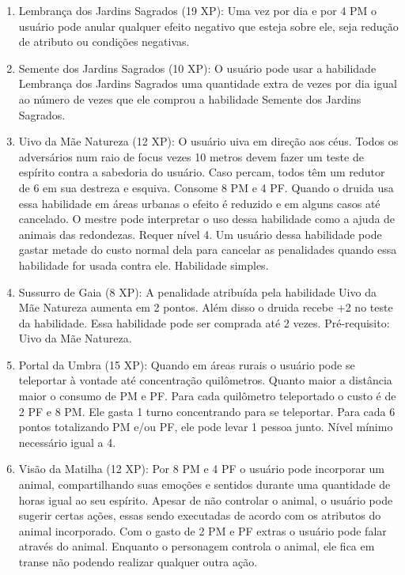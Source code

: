 \begin{enumerate}
  	 
			\item Lembrança dos Jardins Sagrados (19 XP): Uma vez por dia e por 4 PM o usuário pode anular qualquer efeito negativo que esteja sobre ele, seja redução de atributo ou condições negativas.

			  \item Semente dos Jardins Sagrados (10 XP): O usuário pode usar a habilidade Lembrança dos Jardins Sagrados uma quantidade extra de vezes por dia igual ao número de vezes que ele comprou a habilidade Semente dos Jardins Sagrados.

  	\item Uivo da Mãe Natureza (12 XP): O usuário uiva em direção aos céus. Todos os adversários num raio de focus vezes 10 metros devem fazer um teste de espírito contra a sabedoria do usuário. Caso percam, todos têm um redutor de 6 em sua destreza e esquiva. Consome 8 PM e 4 PF. Quando o druida usa essa habilidade em áreas urbanas o efeito é reduzido e em alguns casos até cancelado. O mestre pode interpretar o uso dessa habilidade como a ajuda de animais das redondezas. Requer nível 4. Um usuário dessa habilidade pode gastar metade do custo normal dela para cancelar as penalidades quando essa habilidade for usada contra ele. Habilidade simples.
	  
    \item Sussurro de Gaia (8 XP): A penalidade atribuída pela habilidade Uivo da Mãe Natureza aumenta em 2 pontos. Além disso o druida recebe +2 no teste da habilidade. Essa habilidade pode ser comprada até 2 vezes. Pré-requisito: Uivo da Mãe Natureza.
  
  	\item Portal da Umbra (15 XP): Quando em áreas rurais o usuário pode se teleportar à vontade até concentração quilômetros. Quanto maior a distância maior o consumo de PM e PF. Para cada quilômetro teleportado o custo é de 2 PF e 8 PM. Ele gasta 1 turno concentrando para se teleportar. Para cada 6 pontos totalizando PM e/ou PF, ele pode levar 1 pessoa junto. Nível mínimo necessário igual a 4.
  
  	\item Visão da Matilha (12 XP): Por 8 PM e 4 PF o usuário pode incorporar um animal, compartilhando suas emoções e sentidos durante uma quantidade de horas igual ao seu espírito. Apesar de não controlar o animal, o usuário pode sugerir certas ações, essas sendo executadas de acordo com os atributos do animal incorporado. Com o gasto de 2 PM e PF extras o usuário pode falar através do animal. Enquanto o personagem controla o animal, ele fica em transe não podendo realizar qualquer outra ação.
  

\end{enumerate}
